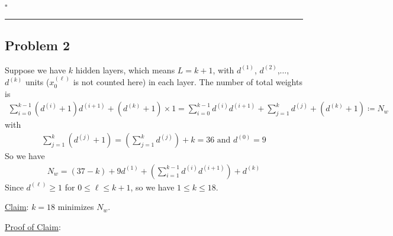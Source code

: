 \documentclass[12pt]{article}
\newcommand*{\QEDB}{\hfill\ensuremath{\square}}
\newcommand{\ParTh}[1]{\left(#1\right)}
\newcommand{\horrule}[1]{\rule{\linewidth}{#1}}
\begin{document}
\QEDB

\horrule{0.5pt}

\subsection*{Problem 2}

Suppose we have $k$ hidden layers, which means $L=k+1$, with $d^{\ParTh{1}}$, $d^{\ParTh{2}}$,$\ldots$, $d^{\ParTh{k}}$ units ($x^{\ParTh{\ell}}_0$ is not counted here) in each layer. The number of total weights is
\begin{align}
\sum_{i=0}^{k-1}\ParTh{d^{\ParTh{i}}+1}d^{\ParTh{i+1}}+\ParTh{d^{\ParTh{k}}+1}\times1=\sum_{i=0}^{k-1}d^{\ParTh{i}}d^{\ParTh{i+1}}+\sum_{j=1}^{k}d^{\ParTh{j}}+\ParTh{d^{\ParTh{k}}+1}\coloneqq N_w
\end{align}
with
\begin{align}
\sum_{j=1}^{k}\ParTh{d^{\ParTh{j}}+1}=\ParTh{\sum_{j=1}^{k}d^{\ParTh{j}}}+k=36\text{ and }d^{\ParTh{0}}=9
\end{align}
So we have
\begin{align}
N_w=\ParTh{37-k}+9d^{\ParTh{1}}+\ParTh{\sum_{i=1}^{k-1}d^{\ParTh{i}}d^{\ParTh{i+1}}}+d^{\ParTh{k}}
\end{align}
Since $d^{\ParTh{\ell}}\geq1$ for $0\leq\ell\leq k+1$, so we have $1\leq k\leq18$.

\underline{Claim}: $k=18$ minimizes $N_w$.

\underline{Proof of Claim}:
\end{document}
